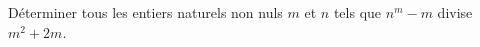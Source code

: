 \documentclass[varwidth]{standalone}
\begin{document}
    D\'eterminer tous les entiers naturels non nuls $m$ et $n$ tels que $n^m - m$ divise $m^2 + 2m$.
\end{document}

